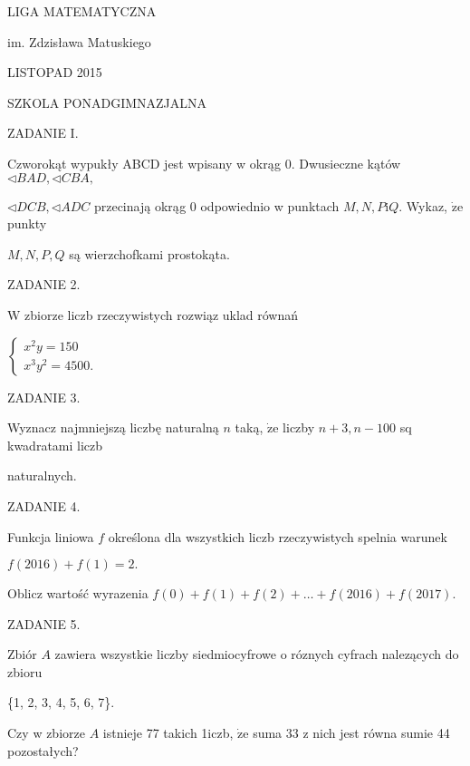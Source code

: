 \documentclass[a4paper,12pt]{article}
\begin{document}
LIGA MATEMATYCZNA

im. Zdzisława Matuskiego

LISTOPAD 2015

SZKOLA PONADGIMNAZJALNA

ZADANIE I.

Czworokąt wypukły ABCD jest wpisany w okrąg $0$. Dwusieczne kątów $\triangleleft BAD, \triangleleft CBA,$

$\triangleleft DCB, \triangleleft ADC$ przecinają okrąg $0$ odpowiednio w punktach $M, N, P\mathrm{i}Q$. Wykaz, $\dot{\mathrm{z}}\mathrm{e}$ punkty

$M, N, P, Q$ są wierzchofkami prostokąta.

ZADANIE 2.

$\mathrm{W}$ zbiorze liczb rzeczywistych rozwiąz uklad równań

$\left\{\begin{array}{l}
x^{2}y=150\\
x^{3}y^{2}=4500.
\end{array}\right.$

ZADANIE 3.

Wyznacz najmniejszą liczbę naturalną $n$ taką, $\dot{\mathrm{z}}\mathrm{e}$ liczby $n+3, n-100$ sq kwadratami liczb

naturalnych.

ZADANIE 4.

Funkcja liniowa $f$ określona dla wszystkich liczb rzeczywistych spelnia warunek

$f(2016)+f(1)=2.$

Oblicz wartość wyrazenia $f(0)+f(1)+f(2)+\ldots+f(2016)+f(2017).$

ZADANIE 5.

Zbiór $A$ zawiera wszystkie liczby siedmiocyfrowe o róznych cyfrach nalezących do zbioru

\{1, 2, 3, 4, 5, 6, 7\}.

Czy w zbiorze $A$ istnieje 77 takich 1iczb, $\dot{\mathrm{z}}\mathrm{e}$ suma 33 z nich jest równa sumie 44 pozostałych?
\end{document}

